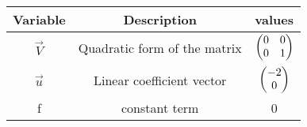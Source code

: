 \begin{tabular}[12pt]{ |c| c| c |}
    \hline
    \textbf{Variable} & \textbf{Description} & \textbf{values}\\ 
    \hline
    $\vec{V}$ & Quadratic form of the matrix & $\begin{pmatrix}0 & 0 \\ 0 & 1\end{pmatrix} $\\
    \hline
    $\vec{u}$ & Linear coefficient vector & $\begin{pmatrix}-2 \\ 0\end{pmatrix} $\\
    \hline
    f & constant term & 0 \\ 
    \hline
\end{tabular}
